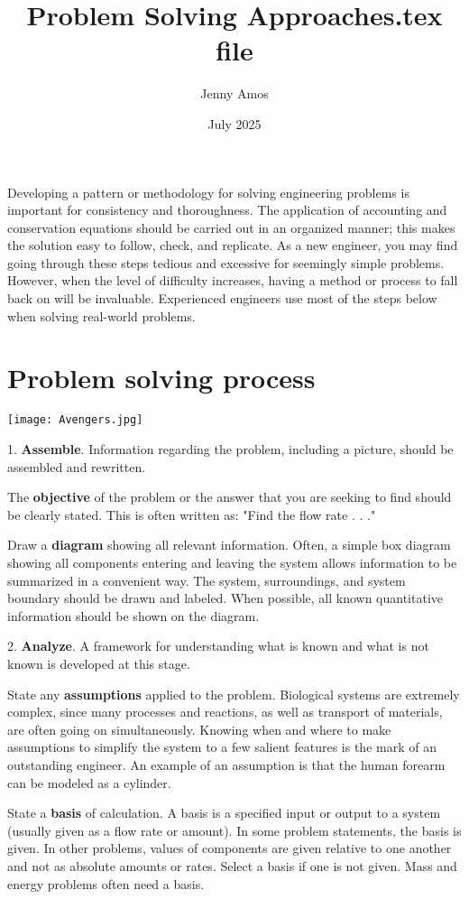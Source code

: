 \documentclass{article}
\title{Problem Solving Approaches.tex file}
\author{Jenny Amos}
\date{July 2025}
\begin{document}
\maketitle
Developing a pattern or methodology for solving engineering problems is important for consistency and thoroughness. The application of accounting and conservation equations should be carried out in an organized manner; this makes the solution easy to follow, check, and replicate. As a new engineer, you may find going through these steps tedious and excessive for seemingly simple problems. However, when the level of difficulty increases, having a method or process to fall back on will be invaluable. Experienced engineers use most of the steps below when solving real-world problems.

\section{Problem solving process}

\texttt{[image: Avengers.jpg]}


1. \textbf{Assemble}. Information regarding the problem, including a picture, should be assembled and rewritten.

The \textbf{objective} of the problem or the answer that you are seeking to find should be clearly stated. This is often written as: "Find the flow rate . . ."

Draw a \textbf{diagram} showing all relevant information. Often, a simple box diagram showing all components entering and leaving the system allows information to be summarized in a convenient way. The system, surroundings, and system boundary should be drawn and labeled. When possible, all known quantitative information should be shown on the diagram.

2. \textbf{Analyze}. A framework for understanding what is known and what is not known is developed at this stage.

State any \textbf{assumptions} applied to the problem. Biological systems are extremely complex, since many processes and reactions, as well as transport of materials, are often going on simultaneously. Knowing when and where to make assumptions to simplify the system to a few salient features is the mark of an outstanding engineer. An example of an assumption is that the human forearm can be modeled as a cylinder.

State a \textbf{basis} of calculation. A basis is a specified input or output to a system (usually given as a flow rate or amount). In some problem statements, the basis is given. In other problems, values of components are given relative to one another and not as absolute amounts or rates. Select a basis if one is not given. Mass and energy problems often need a basis.
\end{document}
